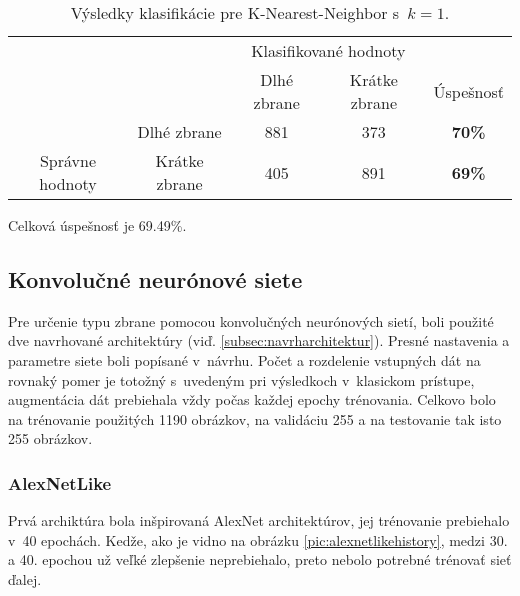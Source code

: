 \begin{table}[H]
    \centering
    \begin{tabular}{ccccc}
                                                                &                                    & \multicolumn{2}{c}{Klasifikované hodnoty}                                                         &                                    \\ \cline{3-5} 
                                                                & \multicolumn{1}{c|}{}              & \multicolumn{1}{c|}{Dlhé zbrane}                & \multicolumn{1}{c|}{Krátke zbrane}              & \multicolumn{1}{c|}{Úspešnosť}     \\ \cline{2-5} 
        \multicolumn{1}{c|}{}                                  & \multicolumn{1}{c|}{Dlhé zbrane}   & \multicolumn{1}{c|}{{\color[HTML]{009901} 881}} & \multicolumn{1}{c|}{{\color[HTML]{9A0000} 373}} & \multicolumn{1}{c|}{\textbf{70\%}} \\ \cline{2-5} 
        \multicolumn{1}{c|}{\multirow{-2}{*}{Správne hodnoty}} & \multicolumn{1}{c|}{Krátke zbrane} & \multicolumn{1}{c|}{{\color[HTML]{9A0000} 405}} & \multicolumn{1}{c|}{{\color[HTML]{009901} 891}} & \multicolumn{1}{c|}{\textbf{69\%}} \\ \cline{2-5} 
    \end{tabular}
    \caption{Výsledky klasifikácie pre K-Nearest-Neighbor s~$k=1$.}
    \label{tab:kmeans1}
\end{table}
Celková úspešnosť je 69.49\%.


\subsection{Konvolučné neurónové siete}
Pre určenie typu zbrane pomocou konvolučných neurónových sietí, boli použité dve navrhované architektúry (viď. \ref{subsec:navrharchitektur}).
Presné nastavenia a parametre siete boli popísané v~návrhu.
Počet a rozdelenie vstupných dát na rovnaký pomer je totožný s~uvedeným pri výsledkoch v~klasickom prístupe, augmentácia dát
    prebiehala vždy počas každej epochy trénovania.
Celkovo bolo na trénovanie použitých 1190 obrázkov, na validáciu 255 a na testovanie tak isto 255 obrázkov.

\subsubsection{AlexNetLike}
Prvá archiktúra bola inšpirovaná AlexNet architektúrov, jej trénovanie prebiehalo v~40 epochách.
Kedže, ako je vidno na obrázku \ref{pic:alexnetlikehistory}, medzi 30. a 40. epochou už veľké zlepšenie neprebiehalo, preto nebolo potrebné trénovať sieť ďalej.

